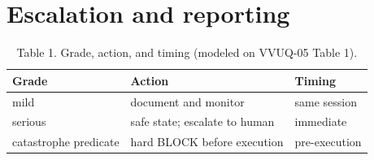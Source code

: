 \section{Escalation and reporting}
\label{sec:d}

\begin{table}[H]
\centering
\footnotesize
\begin{tabularx}{\textwidth}{@{}L{2.4cm} Y L{2.6cm}@{}}
\toprule
\textbf{Grade} & \textbf{Action} & \textbf{Timing}\\
\midrule
mild & document and monitor & same session\\
serious & safe state; escalate to human & immediate\\
catastrophe predicate & hard BLOCK before execution & pre-execution\\
\bottomrule
\end{tabularx}
\caption{Table 1. Grade, action, and timing (modeled on VVUQ-05 Table 1).}\label{tab:escalation}
\end{table}
